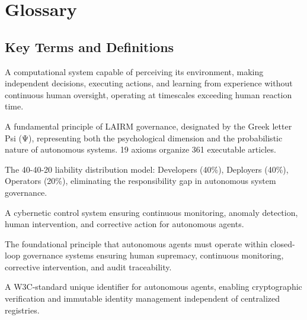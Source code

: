 
\chapter*{Glossary}

\section*{Key Terms and Definitions}

\begin{description}[style=nextline,labelwidth=3cm]

\item[\textbf{Autonomous Agent}]
A computational system capable of perceiving its environment, making independent decisions, executing actions, and learning from experience without continuous human oversight, operating at timescales exceeding human reaction time.

\item[\textbf{Axiom (Ψ)}]
A fundamental principle of LAIRM governance, designated by the Greek letter Psi (Ψ), representing both the psychological dimension and the probabilistic nature of autonomous systems. 19 axioms organize 361 executable articles.

\item[\textbf{Cascading Responsibility}]
The 40-40-20 liability distribution model: Developers (40\%), Deployers (40\%), Operators (20\%), eliminating the responsibility gap in autonomous system governance.

\item[\textbf{Closed-Loop Governance}]
A cybernetic control system ensuring continuous monitoring, anomaly detection, human intervention, and corrective action for autonomous agents.

\item[\textbf{Cybernetic Criterion}]
The foundational principle that autonomous agents must operate within closed-loop governance systems ensuring human supremacy, continuous monitoring, corrective intervention, and audit traceability.

\item[\textbf{Decentralized Identifier (DID)}]
A W3C-standard unique identifier for autonomous agents, enabling cryptographic verification and immutable identity management independent of centralized registries.


\end{description}
